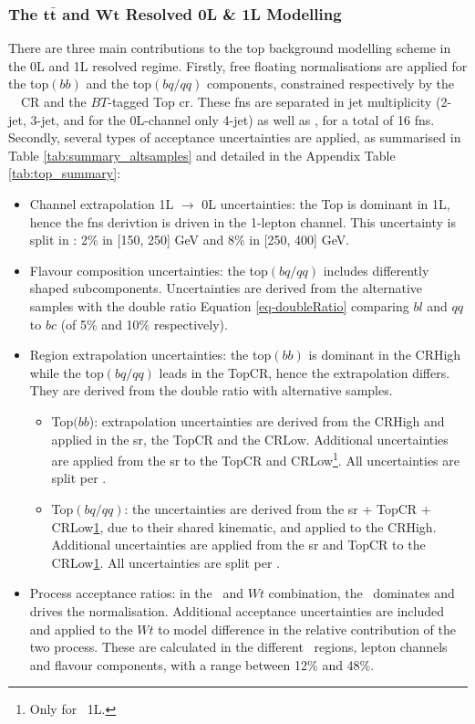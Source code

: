 \subsubsection{The $\boldsymbol{t\bar{t}}$ and $\boldsymbol{Wt}$ Resolved 0L \& 1L Modelling}
There are three main contributions to the top background modelling scheme in the 0L and 1L resolved regime. Firstly, free floating normalisations are applied for the top$(bb)$ and the top$(bq/qq)$ components, constrained respectively by the \vhb\ \highdr\ CR and the $BT$-tagged Top \gls{cr}. These \gls{fn}s are separated in jet multiplicity \nj (2-jet, 3-jet, and for the 0L-channel only 4-jet) as well as \ptv, for a total of 16 \gls{fn}s. Secondly, several types of acceptance uncertainties are applied, as summarised in Table \ref{tab:summary_altsamples} and detailed in the Appendix Table \ref{tab:top_summary}:
\begin{itemize}[leftmargin=*]
    \item Channel extrapolation 1L $\rightarrow$ 0L uncertainties: the Top is dominant in 1L, hence the \gls{fn}s derivtion is driven in the 1-lepton channel. This uncertainty is split in \ptv: 2\% in [150, 250] GeV and 8\% in [250, 400] GeV.
    \item Flavour composition uncertainties: the top$(bq/qq)$ includes differently shaped subcomponents. Uncertainties are derived from the alternative samples with the double ratio Equation \ref{eq-doubleRatio} comparing $bl$ and $qq$ to $bc$ (of 5\% and 10\% respectively). 
    \item Region extrapolation uncertainties: the top$(bb)$ is dominant in the CRHigh while the top$(bq/qq)$ leads in the TopCR, hence the extrapolation differs. They are derived from the double ratio with alternative samples.
    \begin{itemize}
        \item Top$(bb$): extrapolation uncertainties are derived from the CRHigh and applied in the \gls{sr}, the TopCR and the CRLow. Additional uncertainties are applied from the \gls{sr} to the TopCR and CRLow\footnote{\label{footnote-crlow}Only for \vhb\ 1L.}. All uncertainties are split per \ptv.
        \item Top$(bq/qq)$: the uncertainties are derived from the \gls{sr} + TopCR + CRLow\cref{footnote-crlow}, due to their shared kinematic, and applied to the CRHigh. Additional uncertainties are applied from the \gls{sr} and TopCR to the CRLow\cref{footnote-crlow}. All uncertainties are split per \ptv.
    \end{itemize}
    \item Process acceptance ratios: in the \ttb\ and $Wt$ combination, the \ttb\ dominates and drives the normalisation. Additional acceptance uncertainties are included and applied to the $Wt$ to model difference in the relative contribution of the two process. These are calculated in the different \ptv\ regions, lepton channels and flavour components, with a range between 12\% and 48\%.
\end{itemize}
